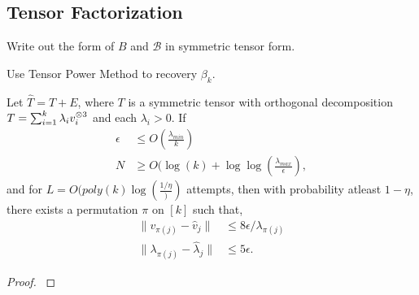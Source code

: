 \subsection{Tensor Factorization}
\label{sec:tensor-power}

Write out the form of $B$ and $\mathcal{B}$ in symmetric tensor form.

Use Tensor Power Method to recovery $\beta_k$.

\begin{lemma}
  Let $\hat T = T + E$, where $T$ is a symmetric tensor with orthogonal decomposition $T = \sum_{i=1}^k \lambda_i v_i^{\otimes 3}$ and each $\lambda_i > 0$. If 
  \begin{align}
    \epsilon &\le O(\frac{\lambda_{min}}{k}) \\
    N &\ge O(\log(k) + \log \log(\frac{ \lambda_{max} }{\epsilon} ), 
  \end{align}
  and for $L = O( poly(k) \log(\frac{1/\eta}) )$  attempts, then with
  probability atleast $1 - \eta$, there exists a permutation $\pi$ on
  $[k]$ such that,
  \begin{align}
    \|v_{\pi(j)} - \hat v_j\| &\le 8 \epsilon/\lambda_{\pi(j)} \\
    \|\lambda_{\pi(j)} - \hat \lambda_j\| &\le 5 \epsilon.
  \end{align}
\end{lemma}
\begin{proof}
  \cite{AnandkumarGeHsu2012}
\end{proof}


